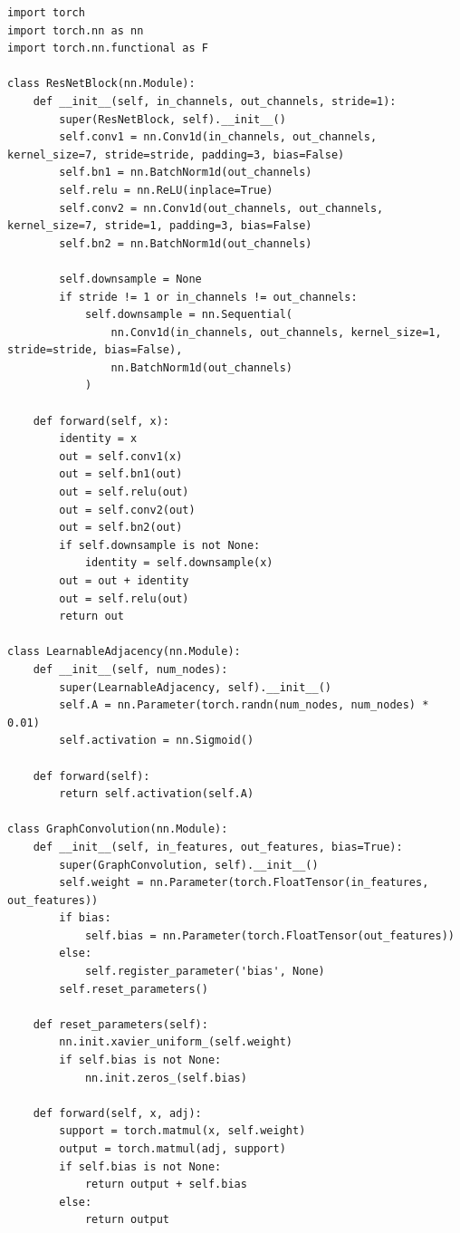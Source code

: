 \documentclass[12pt,a4paper]{report}
\begin{document}
\begin{lstlisting}[caption={Spatio-Temporal Graph Network (ST-ReGE) (src/models/gnn.py)}]
import torch
import torch.nn as nn
import torch.nn.functional as F

class ResNetBlock(nn.Module):
    def __init__(self, in_channels, out_channels, stride=1):
        super(ResNetBlock, self).__init__()
        self.conv1 = nn.Conv1d(in_channels, out_channels, kernel_size=7, stride=stride, padding=3, bias=False)
        self.bn1 = nn.BatchNorm1d(out_channels)
        self.relu = nn.ReLU(inplace=True)
        self.conv2 = nn.Conv1d(out_channels, out_channels, kernel_size=7, stride=1, padding=3, bias=False)
        self.bn2 = nn.BatchNorm1d(out_channels)
        
        self.downsample = None
        if stride != 1 or in_channels != out_channels:
            self.downsample = nn.Sequential(
                nn.Conv1d(in_channels, out_channels, kernel_size=1, stride=stride, bias=False),
                nn.BatchNorm1d(out_channels)
            )

    def forward(self, x):
        identity = x
        out = self.conv1(x)
        out = self.bn1(out)
        out = self.relu(out)
        out = self.conv2(out)
        out = self.bn2(out)
        if self.downsample is not None:
            identity = self.downsample(x)
        out = out + identity
        out = self.relu(out)
        return out

class LearnableAdjacency(nn.Module):
    def __init__(self, num_nodes):
        super(LearnableAdjacency, self).__init__()
        self.A = nn.Parameter(torch.randn(num_nodes, num_nodes) * 0.01)
        self.activation = nn.Sigmoid()

    def forward(self):
        return self.activation(self.A)
    
class GraphConvolution(nn.Module):
    def __init__(self, in_features, out_features, bias=True):
        super(GraphConvolution, self).__init__()
        self.weight = nn.Parameter(torch.FloatTensor(in_features, out_features))
        if bias:
            self.bias = nn.Parameter(torch.FloatTensor(out_features))
        else:
            self.register_parameter('bias', None)
        self.reset_parameters()

    def reset_parameters(self):
        nn.init.xavier_uniform_(self.weight)
        if self.bias is not None:
            nn.init.zeros_(self.bias)

    def forward(self, x, adj):
        support = torch.matmul(x, self.weight) 
        output = torch.matmul(adj, support)
        if self.bias is not None:
            return output + self.bias
        else:
            return output


\end{lstlisting}
\end{document}
